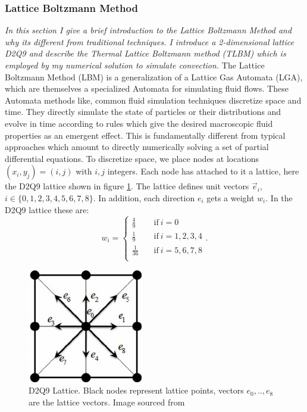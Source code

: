 \documentclass{article}
\begin{document}
\subsubsection*{Lattice Boltzmann Method}
{\it{In this section I give a brief introduction to the Lattice Boltzmann Method and why its different from traditional techniques. I introduce a 2-dimensional lattice D2Q9 and describe the Thermal Lattice Boltzmann method (TLBM) which is employed by my numerical solution to simulate convection.}}
\vspace{0.3cm}
\newline
\noindent The Lattice Boltzmann Method (LBM) is a generalization of a Lattice Gas Automata (LGA), which are themselves a 
specialized Automata for simulating fluid flows. These Automata methods like, common fluid simulation techniques 
discretize space and time. They directly simulate the state of particles or their distributions and evolve in time 
according to rules which give the desired macroscopic fluid properties as an emergent effect. This is fundamentally 
different from typical approaches which amount to directly numerically solving a set of partial differential equations.
\newline
\noindent To discretize space, we place nodes at locations $(x_i,y_j)=(i,j)$ with $i,j$ integers. Each node has attached to it a lattice, here the D2Q9 lattice shown in figure \ref{D2Q9}. The lattice defines unit vectors $\vec{e}_i$, $i \in \{ 0,1,2,3,4,5,6,7,8 \}$. In addition, each direction $e_i$ gets a weight $w_i$. In the D2Q9 lattice these are:
\begin{equation*}
w_i = \begin{cases}
          \frac{4}{9} \quad &\text{if}  \ i=0 \\
          \frac{1}{9} \quad &\text{if} \ i=1,2,3,4 \\
          \frac{1}{36} \quad &\text{if} \ i=5,6,7,8 \\
     \end{cases}.
\end{equation*}
\begin{figure}[h!]
	\centering
	\includegraphics{D2Q9Lattice.jpg}
	\caption{D2Q9 Lattice. Black nodes represent lattice points, vectors $e_0,..,e_8$ are the lattice vectors. Image sourced from \cite{khazaeli2015ghost}}
	\label{D2Q9}
\end{figure}
\end{document}
